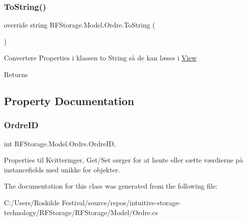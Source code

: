 \subsubsection{\texorpdfstring{ToString()}{ToString()}}
{\footnotesize\ttfamily override string R\+F\+Storage.\+Model.\+Ordre.\+To\+String (\begin{DoxyParamCaption}{ }\end{DoxyParamCaption})}



Convertere Properties i klassen to String så de kan læses i \mbox{\hyperlink{namespace_r_f_storage_1_1_view}{View}} 

\begin{DoxyReturn}{Returns}

\end{DoxyReturn}


\subsection{Property Documentation}
\mbox{\label{class_r_f_storage_1_1_model_1_1_ordre_a38789ca8f1e1770fdc42322d4449cbd0}} 
\subsubsection{\texorpdfstring{OrdreID}{OrdreID}}
{\footnotesize\ttfamily int R\+F\+Storage.\+Model.\+Ordre.\+Ordre\+ID\hspace{0.3cm}{\ttfamily [get]}, {\ttfamily [set]}}



Properties til Kvitteringer, Get/\+Set sørger for at hente eller sætte værdierne på instancefields med unikke for objekter. 



The documentation for this class was generated from the following file\+:\begin{DoxyCompactItemize}
\item 
C\+:/\+Users/\+Roskilde Festival/source/repos/intuitive-\/storage-\/technology/\+R\+F\+Storage/\+R\+F\+Storage/\+Model/Ordre.\+cs\end{DoxyCompactItemize}
